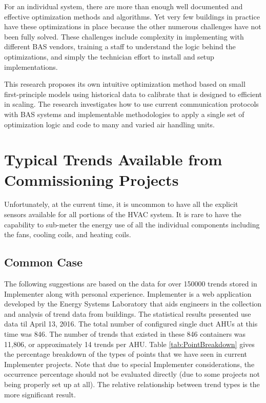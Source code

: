 For an individual system, there are more than enough well documented and
effective optimization methods and algorithms. Yet very few buildings in
practice have these optimizations in place because the other numerous
challenges have not been fully solved. These challenges include
complexity in implementing with different BAS vendors, training a staff
to understand the logic behind the optimizations, and simply the
technician effort to install and setup implementations.

This research proposes its own intuitive optimization method based on
small first-principle models using historical data to calibrate that is
designed to efficient in scaling. The research investigates how to use
current communication protocols with BAS systems and implementable
methodologies to apply a single set of optimization logic and code to
many and varied air handling units. 

\section{Typical Trends Available from Commissioning Projects}

Unfortunately, at the current time, it is uncommon to have all the
explicit sensors available for all portions of the HVAC system.  It is
rare to have the capability to sub-meter the energy use of all the
individual components including the fans, cooling coils, and heating
coils. 

\subsection{Common Case}

The following suggestions are based on the data for over \num{150000}
trends stored in Implementer along with personal experience. Implementer
is a web application developed by the Energy Systems Laboratory that
aids engineers in the collection and analysis of trend data from
buildings.  The statistical results presented use data til April 13,
2016. The total number of configured single duct AHUs at this time was
846. The number of trends that existed in these 846 containers was
11,806, or approximately 14 trends per AHU. Table
\ref{tab:PointBreakdown} gives the percentage breakdown of the types of
points that we have seen in current Implementer projects. Note that due
to special Implementer considerations, the occurrence percentage
should not be evaluated directly (due to some projects not being
properly set up at all). The relative relationship between trend types is
the more significant result.  


